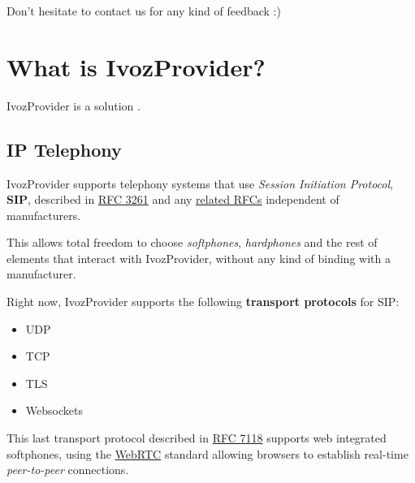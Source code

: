 \documentclass[letterpaper,10pt,spanish]{sphinxmanual}
\begin{document}
Don't hesitate to contact us for any kind of feedback :)


\section{What is IvozProvider?}
\label{basic_concepts/intro/what_is_ivozprovider::doc}\label{basic_concepts/intro/what_is_ivozprovider:what-is-ivozprovider}
IvozProvider is a {\hyperref[basic_concepts/intro/what_is_ivozprovider:operator\string-oriented]{}}
{\hyperref[basic_concepts/intro/what_is_ivozprovider:multilevel]{}} {\hyperref[basic_concepts/intro/what_is_ivozprovider:voip]{}} solution
{\hyperref[basic_concepts/intro/what_is_ivozprovider:exposed]{}}.


\subsection{IP Telephony}
\label{basic_concepts/intro/what_is_ivozprovider:ip-telephony}\label{basic_concepts/intro/what_is_ivozprovider:voip}
IvozProvider supports telephony systems that use \emph{Session Initiation
Protocol}, \textbf{SIP}, described in \href{https://tools.ietf.org/html/rfc3261}{RFC 3261} and any \href{https://www.packetizer.com/ipmc/sip/standards.html}{related RFCs} independent of
manufacturers.

This allows total freedom to choose \emph{softphones}, \emph{hardphones} and the
rest of elements that interact with IvozProvider, without any kind of
binding with a manufacturer.

Right now, IvozProvider supports the following \textbf{transport protocols}
for SIP:
\begin{itemize}
\item {} 
UDP

\item {} 
TCP

\item {} 
TLS

\item {} 
Websockets

\end{itemize}

This last transport protocol described in \href{https://tools.ietf.org/html/rfc7118}{RFC 7118} supports web integrated
softphones, using the \href{https://webrtc.org/}{WebRTC} standard allowing
browsers to establish real-time \emph{peer-to-peer} connections.
\end{document}
